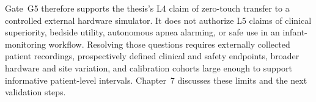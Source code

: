 Gate~G5 therefore supports the thesis's L4 claim of zero-touch transfer to a controlled external hardware simulator. It does not authorize L5 claims of clinical superiority, bedside utility, autonomous apnea alarming, or safe use in an infant-monitoring workflow. Resolving those questions requires externally collected patient recordings, prospectively defined clinical and safety endpoints, broader hardware and site variation, and calibration cohorts large enough to support informative patient-level intervals. Chapter~7 discusses these limits and the next validation steps.

